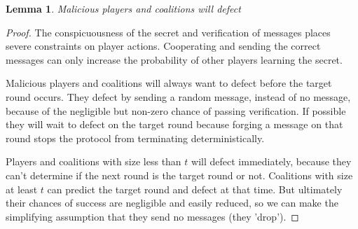 \documentclass{dalcsthesis}
\newtheorem{lemma}{Lemma}
\begin{document}
\begin{lemma} Malicious players and coalitions will defect \end{lemma}
\begin{proof}
The conspicuousness of the secret and verification of messages places severe constraints on player actions. Cooperating and sending the correct messages can only increase the probability of other players learning the secret.

Malicious players and coalitions will always want to defect before the target round occurs. They defect by sending a random message, instead of no message, because of the negligible but non-zero chance of passing verification. If possible they will wait to defect on the target round because forging a message on that round stops the protocol from terminating deterministically.

Players and coalitions with size less than $t$ will defect immediately, because they can't determine if the next round is the target round or not. Coalitions with size at least $t$ can predict the target round and defect at that time. But ultimately their chances of success are negligible and easily reduced, so we can make the simplifying assumption that they send no messages (they 'drop').
\end{proof}
\end{document}
